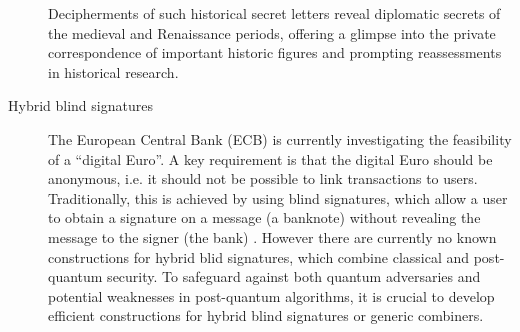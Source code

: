 \documentclass{article}
\begin{document}
\begin{description}
 Decipherments of such historical secret letters
 reveal diplomatic secrets of the medieval and Renaissance periods, offering a glimpse into the private correspondence of important historic figures and prompting reassessments in historical research.
    \item[Hybrid blind signatures] The European Central Bank (ECB) is currently investigating the feasibility of a ``digital Euro''. A key requirement is that the digital Euro should be anonymous, i.e. it should not be possible to link transactions to users. Traditionally, this is achieved by using blind signatures, which allow a user to obtain a signature on a message (a banknote) without revealing the message to the signer (the bank) \cite{Chaum82}. However there are currently no known constructions for hybrid blid signatures, which combine classical and post-quantum security. To safeguard against both quantum adversaries and potential weaknesses in post-quantum algorithms,  it is crucial to develop efficient constructions for hybrid blind signatures or generic combiners.

\end{description}


\end{document}
